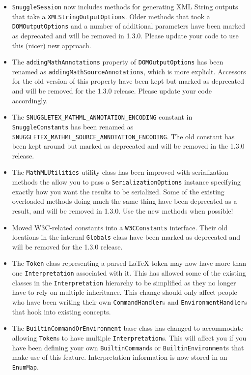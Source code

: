 \begin{itemize}
\item \verb|SnuggleSession| now includes methods for generating XML String outputs that take
a \verb|XMLStringOutputOptions|. Older methods that took a \verb|DOMOutputOptions| and a number
of additional parameters have been marked as deprecated and will be removed in
1.3.0. Please update your code to use this (nicer) new approach.

\item The \verb|addingMathAnnotations| property of \verb|DOMOutputOptions| has been renamed
as \verb|addingMathSourceAnnotations|, which is more expliclt. Accessors for the old version
of this property have been kept but marked as deprecated and will be removed for the 1.3.0 release.
Please update your code accordingly.

\item The \verb|SNUGGLETEX_MATHML_ANNOTATION_ENCODING| constant in \verb|SnuggleConstants|
has been renamed as \verb|SNUGGLETEX_MATHML_SOURCE_ANNOTATION_ENCODING|. The old constant
has been kept around but marked as deprecated and will be removed in the 1.3.0 release.

\item The \verb|MathMLUtilities| utility class has been improved with serialization methods
the allow you to pass a \verb|SerializationOptions| instance specifying exactly how you want
the results to be serialized. Some of the existing overloaded methods doing much the same thing
have been deprecated as a result, and will be removed in 1.3.0. Use the new methods when possible!


\item Moved W3C-related constants into a \verb|W3CConstants| interface. Their old locations in
the internal \verb|Globals| class have been marked as deprecated and will be removed for the 1.3.0 release.

\item The \verb|Token| class representing a parsed LaTeX token may now have more than one
\verb|Interpretation| associated with it. This has allowed some of the existing classes in
the \verb|Interpretation| hierarchy to be simplified as they no longer have to rely on multiple
inheritance. This change should only affect people who have been writing their own
\verb|CommandHandler|s and \verb|EnvironmentHandler|s that hook into existing concepts.

\item The \verb|BuiltinCommandOrEnvironment| base class has changed to accommodate allowing
\verb|Token|s to have multiple \verb|Interpretation|s. This will affect you if you have been
defining your own \verb|BuiltinCommand|s or \verb|BuiltinEnvironment|s that make use of this feature.
Interpretation information is now stored in an \verb|EnumMap|.


\end{itemize}
